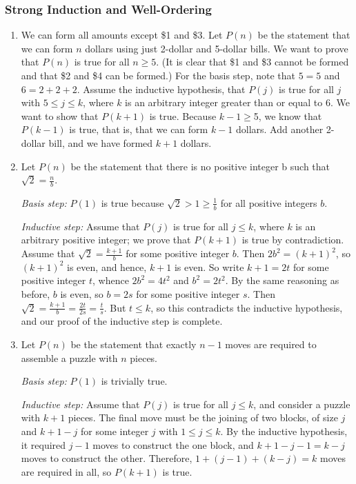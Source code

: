 \documentclass{../../cls/sig-alternate-05-2015}
\begin{document}
\subsubsection{Strong Induction and Well-Ordering}
\begin{enumerate}
\item We can form all amounts except \$1 and \$3. Let $P (n)$
be the statement that we can form $n$ dollars using just 2-dollar
and 5-dollar bills. We want to prove that $P (n)$ is true for all
$n \geq 5$. (It is clear that \$1 and \$3 cannot be formed and that
\$2 and \$4 can be formed.) For the basis step, note that $5 = 5$
and $6 = 2+2+2$. Assume the inductive hypothesis, that $P (j)$
is true for all $j$ with $5 \leq j \leq k$, where $k$ is an arbitrary integer
greater than or equal to $6$. We want to show that $P (k + 1)$ is
true. Because $k-1 \geq $5, we know that $P (k-1)$ is true, that is,
that we can form $k - 1$ dollars. Add another 2-dollar bill, and
we have formed $k + 1$ dollars.
    
    
\item Let $P(n)$ be the statement that there is no positive integer b such that $\sqrt{2} = \frac{n}{b}$.

\textit{Basis step:} $P(1)$ is true because $\sqrt{2} > 1 \ge \frac{1}{b}$ for all positive integers $b$.

\textit{Inductive step:} Assume that $P (j)$ is true for all
$j \le k$,
where $k$ is an arbitrary positive integer;
we prove that $P(k + 1)$ is true by contradiction.
Assume that $\sqrt{2} = \frac{k + 1}{b}$ for some positive integer $b$.
Then $2b^2 = (k + 1)^2$, so $(k + 1)^2$ is even, and hence,
$k + 1$ is even.
So write $k + 1 = 2t$ for some positive integer $t$,
whence $2b^2 = 4t^2$ and $b^2 = 2t^2$.
By the same reasoning as before, $b$ is even,
so $b = 2s$ for some positive integer $s$.
Then $\sqrt{2} = \frac{k + 1}{b} = \frac{2t}{2s} = \frac{t}{s}$.
But $t \le k$,
so this contradicts the inductive hypothesis,
and our proof of the inductive step is complete.

\item Let $P(n)$ be the statement that exactly $n - 1$ moves are required to assemble a puzzle with $n$ pieces.

\textit{Basis step:} $P(1)$ is trivially true.

\textit{Inductive step:} Assume that $P (j)$ is true for all $j \le k$,
and consider a puzzle with $k + 1$ pieces.
The final move must be the joining of two blocks,
of size $j$ and $k + 1 - j$ for some integer $j$ with $1 \le j \le k$.
By the inductive hypothesis,
it required $j - 1$ moves to construct the one block,
and $k + 1 - j - 1 = k - j$ moves to construct the other.
Therefore, $1 + (j - 1) + (k - j) = k$ moves are required in all,
so $P(k + 1)$ is true.


\end{enumerate}
\end{document}
